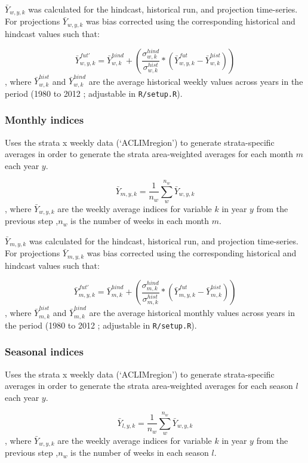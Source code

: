 \documentclass[
]{article}
\begin{document}
\(\bar{Y}_{w,y,k}\) was calculated for the hindcast, historical run, and
projection time-series. For projections \(\bar{Y}_{w,y,k}\) was bias
corrected using the corresponding historical and hindcast values such
that:

\[\bar{Y}^{fut'}_{w,y,k} =\bar{Y}^{hind}_{w,k} +\left( \frac{\sigma^{hind}_{w,k}}{\sigma^{hist}_{w,k}}*(\bar{Y}^{fut}_{w,y,k}-\bar{Y}^{hist}_{w,k})  \right )\],
where \(\bar{Y}^{hist}_{w,k}\) and \(\bar{Y}^{hind}_{w,k}\) are the
average historical weekly values across years in the period (1980 to
2012 ; adjustable in \texttt{R/setup.R}).

\hypertarget{monthly-indices}{%
\subsubsection{Monthly indices}\label{monthly-indices}}

Uses the strata x weekly data (`ACLIMregion') to generate
strata-specific averages in order to generate the strata area-weighted
averages for each month \(m\) each year \(y\).

\[\bar{Y}_{m,y,k}= \frac{1}{n_w}\sum^{n_w}_{w}\bar{Y}_{w,y,k}\], where
\(\bar{Y}_{w,y,k}\) are the weekly average indices for variable \(k\) in
year \(y\) from the previous step ,\(n_w\) is the number of weeks in
each month \(m\).

\(\bar{Y}_{m,y,k}\) was calculated for the hindcast, historical run, and
projection time-series. For projections \(\bar{Y}_{m,y,k}\) was bias
corrected using the corresponding historical and hindcast values such
that:

\[\bar{Y}^{fut'}_{m,y,k} =\bar{Y}^{hind}_{m,k} +\left( \frac{\sigma^{hind}_{m,k}}{\sigma^{hist}_{m,k}}*(\bar{Y}^{fut}_{m,y,k}-\bar{Y}^{hist}_{m,k})  \right )\],
where \(\bar{Y}^{hist}_{m,k}\) and \(\bar{Y}^{hind}_{m,k}\) are the
average historical monthly values across years in the period (1980 to
2012 ; adjustable in \texttt{R/setup.R}).

\hypertarget{seasonal-indices}{%
\subsubsection{Seasonal indices}\label{seasonal-indices}}

Uses the strata x weekly data (`ACLIMregion') to generate
strata-specific averages in order to generate the strata area-weighted
averages for each season \(l\) each year \(y\).

\[\bar{Y}_{l,y,k}= \frac{1}{n_w}\sum^{n_w}_{w}\bar{Y}_{w,y,k}\], where
\(\bar{Y}_{w,y,k}\) are the weekly average indices for variable \(k\) in
year \(y\) from the previous step ,\(n_w\) is the number of weeks in
each season \(l\).
\end{document}
